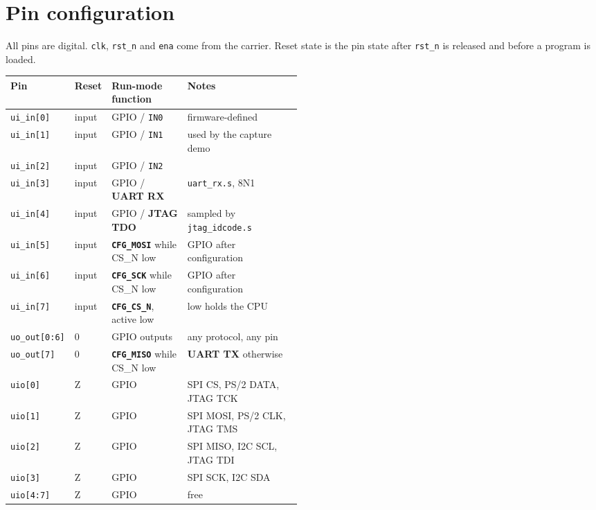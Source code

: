 \documentclass[10pt,a4paper]{article}
\begin{document}
\section{Pin configuration}

All pins are digital. \texttt{clk}, \texttt{rst\_n} and \texttt{ena} come from the
carrier. Reset state is the pin state after \texttt{rst\_n} is released and before
a program is loaded.

\begin{center}
\begin{tabularx}{\linewidth}{@{}L{0.13\linewidth}L{0.10\linewidth}L{0.26\linewidth}X@{}}
\toprule
\textbf{Pin} & \textbf{Reset} & \textbf{Run-mode function} & \textbf{Notes}\\
\midrule
\texttt{ui\_in[0]} & input & GPIO / \texttt{IN0} & firmware-defined\\
\texttt{ui\_in[1]} & input & GPIO / \texttt{IN1} & used by the capture demo\\
\texttt{ui\_in[2]} & input & GPIO / \texttt{IN2} & \\
\texttt{ui\_in[3]} & input & GPIO / \textbf{UART RX} & \texttt{uart\_rx.s}, 8N1\\
\texttt{ui\_in[4]} & input & GPIO / \textbf{JTAG TDO} & sampled by \texttt{jtag\_idcode.s}\\
\texttt{ui\_in[5]} & input & \textbf{\texttt{CFG\_MOSI}} while CS\_N low & GPIO after configuration\\
\texttt{ui\_in[6]} & input & \textbf{\texttt{CFG\_SCK}} while CS\_N low & GPIO after configuration\\
\texttt{ui\_in[7]} & input & \textbf{\texttt{CFG\_CS\_N}}, active low & low holds the CPU\\
\texttt{uo\_out[0:6]} & 0 & GPIO outputs & any protocol, any pin\\
\texttt{uo\_out[7]} & 0 & \textbf{\texttt{CFG\_MISO}} while CS\_N low & \textbf{UART TX} otherwise\\
\texttt{uio[0]} & Z & GPIO & SPI CS, PS/2 DATA, JTAG TCK\\
\texttt{uio[1]} & Z & GPIO & SPI MOSI, PS/2 CLK, JTAG TMS\\
\texttt{uio[2]} & Z & GPIO & SPI MISO, I2C SCL, JTAG TDI\\
\texttt{uio[3]} & Z & GPIO & SPI SCK, I2C SDA\\
\texttt{uio[4:7]} & Z & GPIO & free\\
\bottomrule
\end{tabularx}
\end{center}
\end{document}
